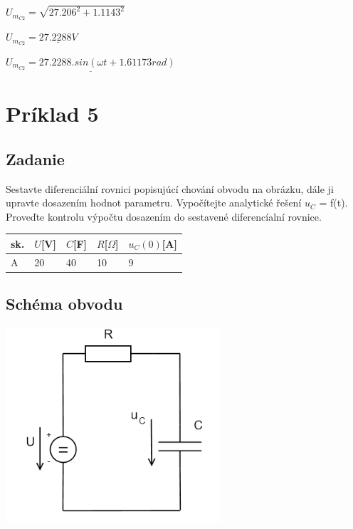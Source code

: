 \documentclass[10pt,a4paper]{article}
\begin{document}
$U_{m_{C2}} = \sqrt{27.206^{2}+1.1143^{2}}$

\vspace*{0.1cm}

$U_{m_{C2}} = \underline{27.2288 V}$

\vspace*{0.5cm}

$\underline{U_{m_{C2}}=27.2288.sin(\omega t+1.61173 rad)}$



 


\newpage
 \section {Príklad 5}
 
 \subsection*{Zadanie}
 
 Sestavte diferenciální rovnici popisujúcí chování obvodu na obrázku, dále ji upravte dosazením hodnot parametru. Vypočítejte analytické řešení $u_{C}$ = f(t). Proveďte kontrolu výpočtu dosazením do sestavené diferencíalní rovnice.
\begin{center}
    \begin{tabular}{ | l | l | l | l | l |}
    	\hline
    	sk.& $U$[V] &  $C$[F] & $R$[$\Omega$] & $u_{C}(0)$[A]\\ \hline
    	A  & 20 &  40 & 10 & 9\\ \hline
    \end{tabular}
\end{center}



\vspace*{1.5cm}   \subsection*{Schéma obvodu}
\includegraphics[clip, width=8cm]{5.png}
\end{document}

